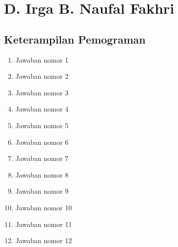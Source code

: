 \section{D. Irga B. Naufal Fakhri}
\subsection{Keterampilan Pemograman}
\begin{enumerate}
\item Jawaban nomor 1


\item Jawaban nomor 2


\item Jawaban nomor 3


\item Jawaban nomor 4


\item Jawaban nomor 5


\item Jawaban nomor 6


\item Jawaban nomor 7


\item Jawaban nomor 8


\item Jawaban nomor 9


\item Jawaban nomor 10


\item Jawaban nomor 11


\item Jawaban nomor 12

\end{enumerate}

